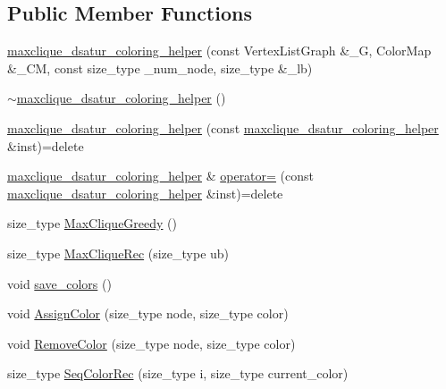 \subsection*{Public Member Functions}
\begin{DoxyCompactItemize}
\item 
\hyperlink{classboost_1_1maxclique__dsatur__coloring__helper_a018730156d996e46d6a9ab2e38935d84}{maxclique\+\_\+dsatur\+\_\+coloring\+\_\+helper} (const Vertex\+List\+Graph \&\+\_\+G, Color\+Map \&\+\_\+\+CM, const size\+\_\+type \+\_\+num\+\_\+node, size\+\_\+type \&\+\_\+lb)
\item 
\hyperlink{classboost_1_1maxclique__dsatur__coloring__helper_acc7336a87e1d310b8044850aeea9a6c6}{$\sim$maxclique\+\_\+dsatur\+\_\+coloring\+\_\+helper} ()
\item 
\hyperlink{classboost_1_1maxclique__dsatur__coloring__helper_a9f8ef23ffcbea873110b5ff92c9a504f}{maxclique\+\_\+dsatur\+\_\+coloring\+\_\+helper} (const \hyperlink{classboost_1_1maxclique__dsatur__coloring__helper}{maxclique\+\_\+dsatur\+\_\+coloring\+\_\+helper} \&inst)=delete
\item 
\hyperlink{classboost_1_1maxclique__dsatur__coloring__helper}{maxclique\+\_\+dsatur\+\_\+coloring\+\_\+helper} \& \hyperlink{classboost_1_1maxclique__dsatur__coloring__helper_a319cdb35be0d7121e295068c5c46f180}{operator=} (const \hyperlink{classboost_1_1maxclique__dsatur__coloring__helper}{maxclique\+\_\+dsatur\+\_\+coloring\+\_\+helper} \&inst)=delete
\item 
size\+\_\+type \hyperlink{classboost_1_1maxclique__dsatur__coloring__helper_a0d161cb723d96561a6fd30413a84af53}{Max\+Clique\+Greedy} ()
\item 
size\+\_\+type \hyperlink{classboost_1_1maxclique__dsatur__coloring__helper_afd63b9cb7e6228c01fb266f19b7db9d3}{Max\+Clique\+Rec} (size\+\_\+type ub)
\item 
void \hyperlink{classboost_1_1maxclique__dsatur__coloring__helper_a3920546347f3636ed6600e846676fedd}{save\+\_\+colors} ()
\item 
void \hyperlink{classboost_1_1maxclique__dsatur__coloring__helper_a1f9b86609393ae2e3a6c2fe178d88d40}{Assign\+Color} (size\+\_\+type node, size\+\_\+type color)
\item 
void \hyperlink{classboost_1_1maxclique__dsatur__coloring__helper_afd706b1d8ee597c8ebea8fc043a3047b}{Remove\+Color} (size\+\_\+type node, size\+\_\+type color)
\item 
size\+\_\+type \hyperlink{classboost_1_1maxclique__dsatur__coloring__helper_a5bd2cf2e839d9d424e788efec7a4dd60}{Seq\+Color\+Rec} (size\+\_\+type i, size\+\_\+type current\+\_\+color)
\end{DoxyCompactItemize}
